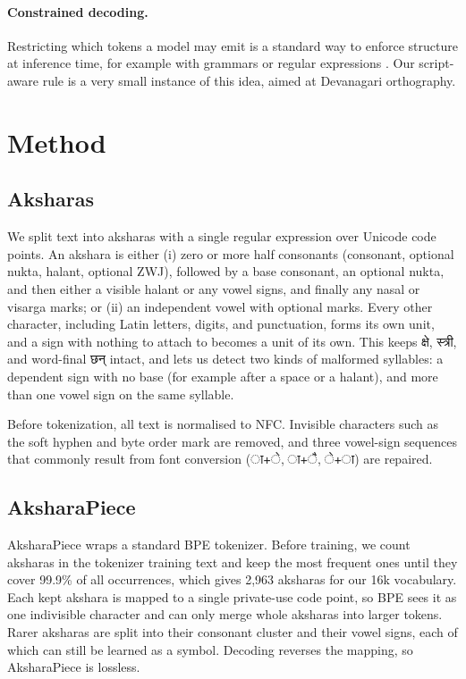 \documentclass[11pt]{article}
\newcommand{\np}[1]{{\devfont #1}}                               %
\newcommand{\ap}{AksharaPiece}
\begin{document}
\paragraph{Constrained decoding.}
Restricting which tokens a model may emit is a standard way to enforce structure at inference time, for example with grammars or regular expressions \citep{geng-etal-2023-grammar,willard2023efficient}. Our script-aware rule is a very small instance of this idea, aimed at Devanagari orthography.

\section{Method}

\subsection{Aksharas}
We split text into aksharas with a single regular expression over Unicode code points. An akshara is either (i) zero or more half consonants (consonant, optional nukta, halant, optional ZWJ), followed by a base consonant, an optional nukta, and then either a visible halant or any vowel signs, and finally any nasal or visarga marks; or (ii) an independent vowel with optional marks. Every other character, including Latin letters, digits, and punctuation, forms its own unit, and a sign with nothing to attach to becomes a unit of its own. This keeps \np{क्षे}, \np{स्त्री}, and word-final \np{छन्} intact, and lets us detect two kinds of malformed syllables: a dependent sign with no base (for example after a space or a halant), and more than one vowel sign on the same syllable.

Before tokenization, all text is normalised to NFC. Invisible characters such as the soft hyphen and byte order mark are removed, and three vowel-sign sequences that commonly result from font conversion (\np{ा}+\np{े}, \np{ा}+\np{ै}, \np{े}+\np{ा}) are repaired.

\subsection{\ap{}}
\ap{} wraps a standard BPE tokenizer. Before training, we count aksharas in the tokenizer training text and keep the most frequent ones until they cover 99.9\% of all occurrences, which gives 2,963 aksharas for our 16k vocabulary. Each kept akshara is mapped to a single private-use code point, so BPE sees it as one indivisible character and can only merge whole aksharas into larger tokens. Rarer aksharas are split into their consonant cluster and their vowel signs, each of which can still be learned as a symbol. Decoding reverses the mapping, so \ap{} is lossless.
\end{document}
